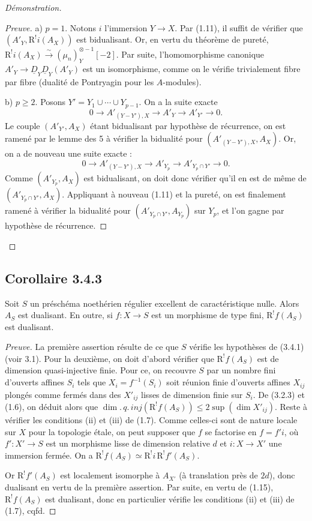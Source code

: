 \documentclass[11pt]{article}
\newcommand{\R}{\mathrm{R}}
\providecommand{\R}{\mathrm R}
\begin{document}
\begin{proof}[Démonstration]
\begin{proof}[Preuve]
a) $p = 1$. Notons $i$ l'immersion $Y \to X$. Par (1.11), il suffit de vérifier que $(A'_Y, \R^{!}i(A_X))$ est bidualisant. Or, en vertu du théorème de pureté, $\R^{!}i(A_X) \xrightarrow{\sim} (\mu_n)^{\otimes -1}_Y[-2]$. Par suite, l'homomorphisme canonique $A'_Y \to \underline{D}_Y \underline{D}_Y(A'_Y)$ est un isomorphisme, comme on le vérifie trivialement fibre par fibre (dualité de Pontryagin pour les $A$-modules).

b) $p \geqslant 2$. Posons $Y' = Y_1 \cup \cdots \cup Y_{p-1}$. On a la suite exacte
\[
0 \longrightarrow A'_{(Y-Y'),X} \longrightarrow A'_Y \longrightarrow A'_{Y'} \longrightarrow 0.
\]
Le couple $(A'_{Y'}, A_X)$ étant bidualisant par hypothèse de récurrence, on est ramené par le lemme des 5 à vérifier la bidualité pour $(A'_{(Y-Y'),X}, A_X)$. Or, on a de nouveau une suite exacte :
\[
0 \longrightarrow A'_{(Y-Y'),X} \longrightarrow A'_{Y_p} \longrightarrow A'_{Y_p \cap Y'} \longrightarrow 0.
\]
Comme $(A'_{Y_p}, A_X)$ est bidualisant, on doit donc vérifier qu'il en est de même de $(A'_{Y_p \cap Y'}, A_X)$. Appliquant à nouveau (1.11) et la pureté, on est finalement ramené à vérifier la bidualité pour $(A'_{Y_p \cap Y'}, A_{Y_p})$ sur $Y_p$, et l'on gagne par hypothèse de récurrence.
\end{proof}
\end{proof}

\subsection*{Corollaire 3.4.3}
Soit $S$ un préschéma noethérien régulier excellent de caractéristique nulle. Alors $A_S$ est dualisant. En outre, si $f : X \to S$ est un morphisme de type fini, $\R^{!}f(A_S)$ est dualisant.

\begin{proof}[Preuve]
La première assertion résulte de ce que $S$ vérifie les hypothèses de (3.4.1) (voir 3.1). Pour la deuxième, on doit d'abord vérifier que $\R^{!}f(A_S)$ est de dimension quasi-injective finie. Pour ce, on recouvre $S$ par un nombre fini d'ouverts affines $S_i$ tels que $X_i = f^{-1}(S_i)$ soit réunion finie d'ouverts affines $X_{ij}$ plongés comme fermés dans des $X'_{ij}$ lisses de dimension finie sur $S_i$. De (3.2.3) et (1.6), on déduit alors que $\dim.\,q.\,inj(\R^{!}f(A_S)) \leqslant 2\sup(\dim X'_{ij})$. Reste à vérifier les conditions (ii) et (iii) de (1.7). Comme celles-ci sont de nature locale sur $X$ pour la topologie étale, on peut supposer que $f$ se factorise en $f = f'i$, où $f' : X' \to S$ est un morphisme lisse de dimension relative $d$ et $i : X \to X'$ une immersion fermée. On a $\R^{!}f(A_S) \simeq \R^{!}i \, \R^{!}f'(A_S)$.

Or $\R^{!}f'(A_S)$ est localement isomorphe à $A_{X'}$ (à translation près de $2d$), donc dualisant en vertu de la première assertion. Par suite, en vertu de (1.15), $\R^{!}f(A_S)$ est dualisant, donc en particulier vérifie les conditions (ii) et (iii) de (1.7), cqfd.
\end{proof}
\end{document}
